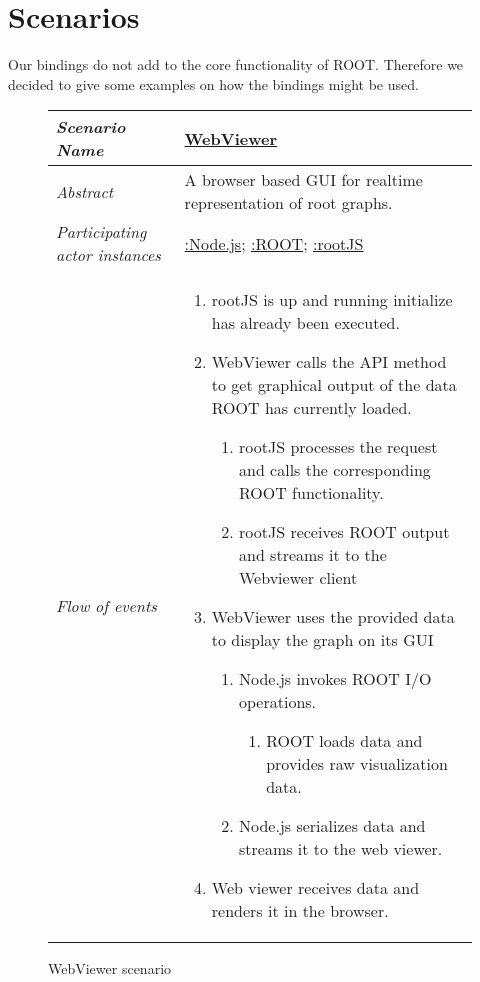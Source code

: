 \section{Scenarios}

Our bindings do not add to the core functionality of ROOT. Therefore 
we decided to give some examples on how the bindings might be used.

\begin{figure}[htb]
	\centering
	\begin{longtable}{p{3cm} @{\hskip 1cm} p{12cm}}
		\hline
		
		\textit{Scenario Name} & \underline{WebViewer}\\
		\hline
	
		\textit{Abstract} & A browser based GUI for realtime representation of root graphs.\\
		\hline
	
		\textit{Participating actor instances} & \underline{:Node.js}; \underline{:ROOT}; \underline{:rootJS}\\
		\hline
	
		\textit{Flow of events} & 
		\begin{enumerate}
			\item rootJS is up and running initialize has already been executed.
			
			\item	WebViewer calls the API method to get graphical output of the data ROOT has currently loaded.
				\begin{enumerate}
					\item rootJS processes the request and calls the corresponding ROOT functionality.
					\item rootJS receives ROOT output and streams it to the Webviewer client
				\end{enumerate}
			\item WebViewer uses the provided data to display the graph on its GUI
				\begin{enumerate}
					\item Node.js invokes ROOT I/O operations.
						\begin{enumerate}
							\item ROOT loads data and provides raw visualization data.
						\end{enumerate}
					\item Node.js serializes data and streams it to the web viewer.
				\end{enumerate}
			\item Web viewer receives data and renders it in the browser.
		\end{enumerate}
		\\
		\hline
		
	\end{longtable}
	
	\caption{WebViewer scenario}
	
\end{figure}

